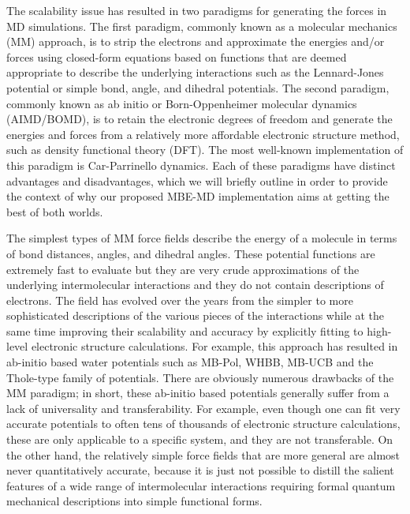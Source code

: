 \documentclass[11pt, proquest]{uwthesis}[2020/02/24]
\begin{document}
\par The scalability issue has resulted in two paradigms for generating the forces in MD simulations. The first paradigm, commonly known as a molecular mechanics (MM)\autocite{karplus_molecular_2005,karplus_molecular_2002,karplus_molecular_1990,rappe_uff_1992,engler_critical_1973,still_semianalytical_1990} approach, is to strip the electrons and approximate the energies and/or forces using closed-form equations based on functions that are deemed appropriate to describe the underlying interactions such as the Lennard-Jones potential or simple bond, angle, and dihedral potentials. The second paradigm, commonly known as ab initio or Born-Oppenheimer molecular dynamics (AIMD/BOMD),\autocite{car_unified_1985,barnett_born-oppenheimer_1993,worth_beyond_2004,li_ab_2005,tuckerman_ab_1996} is to retain the electronic degrees of freedom and generate the energies and forces from a relatively more affordable electronic structure method, such as density functional theory (DFT). The most well-known implementation of this paradigm is Car-Parrinello dynamics.\autocite{car_unified_1985} Each of these paradigms have distinct advantages and disadvantages, which we will briefly outline in order to provide the context of why our proposed MBE-MD implementation aims at getting the best of both worlds.

\par The simplest types of MM force fields describe the energy of a molecule in terms of bond distances, angles, and dihedral angles. These potential functions are extremely fast to evaluate but they are very crude approximations of the underlying intermolecular interactions and they do not contain descriptions of electrons. The field has evolved over the years from the simpler to more sophisticated descriptions of the various pieces of the interactions while at the same time improving their scalability and accuracy by explicitly fitting to high-level electronic structure calculations. For example, this approach has resulted in ab-initio based water potentials such as MB-Pol\autocite{babin_toward_2012,babin_development_2013,babin_development_2014,medders_development_2014}, WHBB\autocite{wang_full-dimensional_2009,wang_towards_2010,wang_flexible_2011}, MB-UCB\autocite{das_development_2019} and the Thole-type family of potentials.\autocite{fanourgakis_flexible_2006,fanourgakis_development_2008,burnham_development_2002} There are obviously numerous drawbacks of the MM paradigm; in short, these ab-initio based potentials generally suffer from a lack of universality and transferability. For example, even though one can fit very accurate potentials to often tens of thousands of electronic structure calculations, these are only applicable to a specific system, and they are not transferable. On the other hand, the relatively simple force fields that are more general are almost never quantitatively accurate, because it is just not possible to distill the salient features of a wide range of intermolecular interactions requiring formal quantum mechanical descriptions into simple functional forms.
\end{document}
